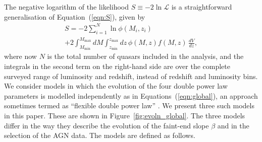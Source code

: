 \documentclass[fleqn,usenatbib]{mnras}
\begin{document}
The negative logarithm of the likelihood $S\equiv -2\ln\mathcal{L}$ is
a straightforward generalisation of Equation~(\ref{eqn:S}), given by
\begin{multline}
  S = -2\sum_{i=1}^N\ln\phi(M_i, z_i)\\+2\int_{M_\mathrm{min}}^{M_\mathrm{max}}dM\int_{z_\mathrm{min}}^{z_\mathrm{max}}dz\, \phi(M,z) f(M, z)\,\frac{dV}{dz},
  \label{eqn:S2}
\end{multline}
where now $N$ is the total number of quasars included in the analysis,
and the integrals in the second term on the right-hand side are over
the complete surveyed range of luminosity and redshift, instead of
redshift and luminosity bins.  We consider models in which the
evolution of the four double power law parameters is modelled
independently as in Equations~(\ref{eqn:global}), an approach
sometimes termed as ``flexible double power law''
\citep{2015MNRAS.451.1892A}.  We present three such models in this
paper.  These are shown in Figure~\ref{fig:evoln_global}.  The three
models differ in the way they describe the evolution of the faint-end
slope $\beta$ and in the selection of the AGN data.  The models are
defined as follows.
\end{document}
